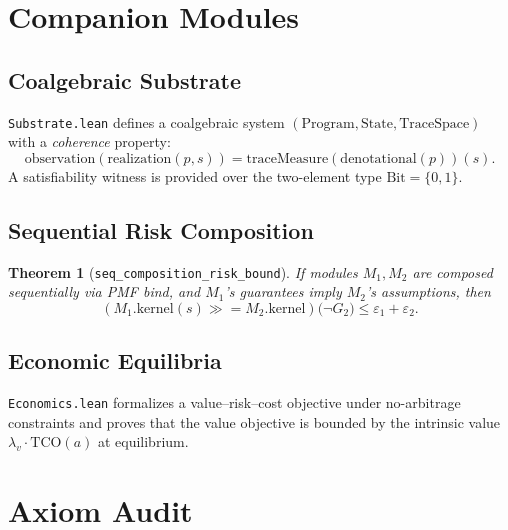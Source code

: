 \documentclass[11pt,a4paper,twocolumn]{article}
\newtheorem{theorem}{Theorem}[section]
\theoremstyle{definition}
\theoremstyle{remark}
\newcommand{\leancode}[1]{\texttt{\color{leanblue}#1}}
\begin{document}
\section{Companion Modules}
\label{sec:companion}

\subsection{Coalgebraic Substrate}

\leancode{Substrate.lean} defines a coalgebraic system
$(\mathrm{Program}, \mathrm{State}, \mathrm{TraceSpace})$ with a
\emph{coherence} property:
\begin{equation}
  \mathrm{observation}(\mathrm{realization}(p, s))
  = \mathrm{traceMeasure}(\mathrm{denotational}(p))(s).
\end{equation}
A satisfiability witness is provided over the two-element type
$\mathrm{Bit} = \{0, 1\}$.

\subsection{Sequential Risk Composition}

\begin{theorem}[\leancode{seq\_composition\_risk\_bound}]
\label{thm:compose}
If modules $M_1, M_2$ are composed sequentially via PMF bind, and
$M_1$'s guarantees imply $M_2$'s assumptions, then
\begin{equation}
  (M_1.\mathrm{kernel}(s) \mathbin{\gg\!=} M_2.\mathrm{kernel})
  \bigl(\neg G_2\bigr)
  \leq \varepsilon_1 + \varepsilon_2.
\end{equation}
\end{theorem}

\subsection{Economic Equilibria}

\leancode{Economics.lean} formalizes a value--risk--cost objective under
no-arbitrage constraints and proves that the value objective is bounded by
the intrinsic value $\lambda_v \cdot \mathrm{TCO}(a)$ at equilibrium.


\section{Axiom Audit}
\label{sec:audit}
\end{document}
